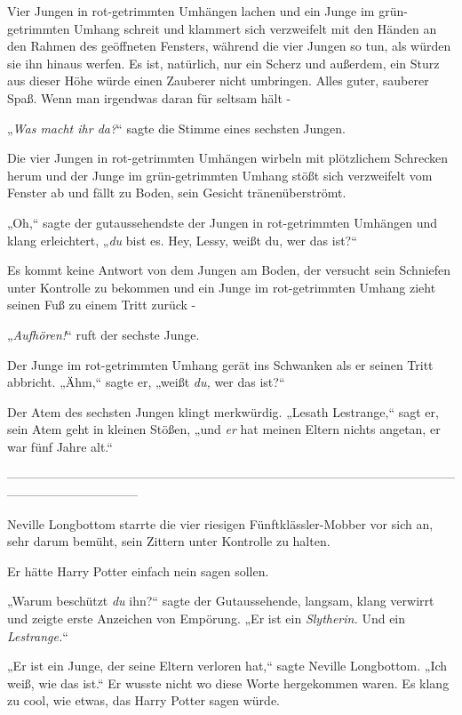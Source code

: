 {Vier Jungen in rot-getrimmten Umhängen lachen und ein Junge im grün-getrimmten Umhang schreit und klammert sich verzweifelt mit den Händen an den Rahmen des geöffneten Fensters, während die vier Jungen so tun, als würden sie ihn hinaus werfen. Es ist, natürlich, nur ein Scherz und außerdem, ein Sturz aus dieser Höhe würde einen Zauberer nicht umbringen. Alles guter, sauberer Spaß. Wenn man irgendwas daran für seltsam hält -

„\emph{Was macht ihr da?}“ sagte die Stimme eines sechsten Jungen.

Die vier Jungen in rot-getrimmten Umhängen wirbeln mit plötzlichem Schrecken herum und der Junge im grün-getrimmten Umhang stößt sich verzweifelt vom Fenster ab und fällt zu Boden, sein Gesicht tränenüberströmt.

„Oh,“ sagte der gutaussehendste der Jungen in rot-getrimmten Umhängen und klang erleichtert, „\emph{du} bist es. Hey, Lessy, weißt du, wer das ist?“

Es kommt keine Antwort von dem Jungen am Boden, der versucht sein Schniefen unter Kontrolle zu bekommen und ein Junge im rot-getrimmten Umhang zieht seinen Fuß zu einem Tritt zurück -

„\emph{Aufhören!}“ ruft der sechste Junge.

Der Junge im rot-getrimmten Umhang gerät ins Schwanken als er seinen Tritt abbricht. „Ähm,“ sagte er, „weißt \emph{du,} wer das ist?“

Der Atem des sechsten Jungen klingt merkwürdig. „Lesath Lestrange,“ sagt er, sein Atem geht in kleinen Stößen, „und \emph{er} hat meinen Eltern nichts angetan, er war fünf Jahre alt.“

--------------------------------------------------------------------------------------------------------------------------------------------

Neville Longbottom starrte die vier riesigen Fünftklässler-Mobber vor sich an, sehr darum bemüht, sein Zittern unter Kontrolle zu halten.

Er hätte Harry Potter einfach nein sagen sollen.

„Warum beschützt \emph{du} ihn?“ sagte der Gutaussehende, langsam, klang verwirrt und zeigte erste Anzeichen von Empörung. „Er ist ein \emph{Slytherin.} Und ein \emph{Lestrange.}“

„Er ist ein Junge, der seine Eltern verloren hat,“ sagte Neville Longbottom. „Ich weiß, wie das ist.“ Er wusste nicht wo diese Worte hergekommen waren. Es klang zu cool, wie etwas, das Harry Potter sagen würde.

}
